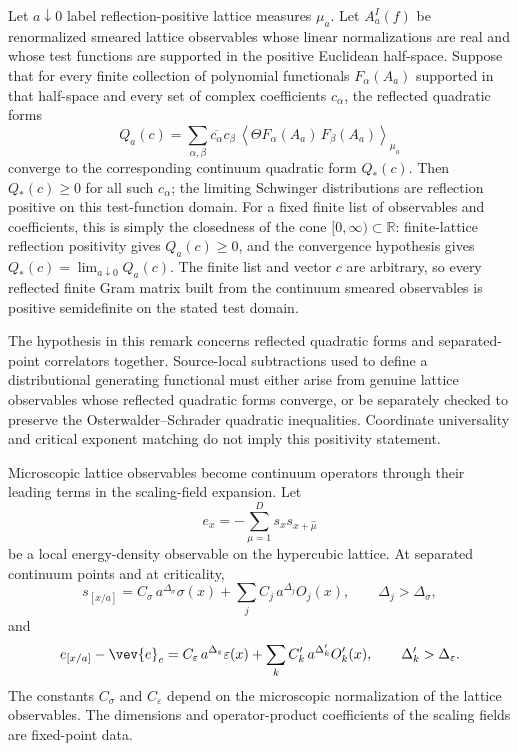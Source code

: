 \begin{remark}
\label{rem:reflection-positivity-closed-under-scaling-limits}
Let \(a\downarrow0\) label reflection-positive lattice measures
\(\mu_a\).  Let \(A_a^I(f)\) be renormalized smeared lattice observables whose
linear normalizations are real and whose test functions are supported in the
positive Euclidean half-space.  Suppose that for every finite collection of
polynomial functionals \(F_\alpha(A_a)\) supported in that half-space and
every set of complex coefficients \(c_\alpha\), the reflected quadratic forms
\[
  Q_a(c)
  =
  \sum_{\alpha,\beta}\overline{c_\alpha}c_\beta\,
  \left\langle
    \Theta F_\alpha(A_a)\,F_\beta(A_a)
  \right\rangle_{\mu_a}
\]
converge to the corresponding continuum quadratic form \(Q_\ast(c)\).  Then
\(Q_\ast(c)\geq0\) for all such \(c_\alpha\); the limiting Schwinger
distributions are reflection positive on this test-function domain.
For a fixed finite list of observables and coefficients, this is simply the
closedness of the cone \([0,\infty)\subset\mathbb R\): finite-lattice
reflection positivity gives \(Q_a(c)\geq0\), and the convergence hypothesis
gives \(Q_\ast(c)=\lim_{a\downarrow0}Q_a(c)\).  The finite list and vector
\(c\) are arbitrary, so every reflected finite Gram matrix built from the
continuum smeared observables is positive semidefinite on the stated test
domain.
\end{remark}

The hypothesis in this remark concerns reflected quadratic forms and
separated-point correlators together.  Source-local
subtractions used to define a distributional generating functional must either
arise from genuine lattice observables whose reflected quadratic forms
converge, or be separately checked to preserve the Osterwalder--Schrader
quadratic inequalities.  Coordinate universality and critical exponent
matching do not imply this positivity statement.

Microscopic lattice observables become continuum operators through their
leading terms in the scaling-field expansion.  Let
\[
  e_x
  =
  -\sum_{\mu=1}^D s_xs_{x+\hat\mu}
\]
be a local energy-density observable on the hypercubic lattice.  At separated
continuum points and at criticality,
\[
  s_{[x/a]}
  =
  C_\sigma\,a^{\Delta_\sigma}\sigma(x)
  +
  \sum_j C_j\,a^{\Delta_j}O_j(x),
  \qquad
  \Delta_j>\Delta_\sigma ,
\]
and
\[
  e_{[x/a]}-\vev{e}_{c}
  =
  C_\varepsilon\,a^{\Delta_\varepsilon}\varepsilon(x)
  +
  \sum_k C'_k\,a^{\Delta'_k}O'_k(x),
  \qquad
  \Delta'_k>\Delta_\varepsilon .
\]
The constants \(C_\sigma\) and \(C_\varepsilon\) depend on the microscopic
normalization of the lattice observables.  The dimensions and operator-product
coefficients of the scaling fields are fixed-point data.

